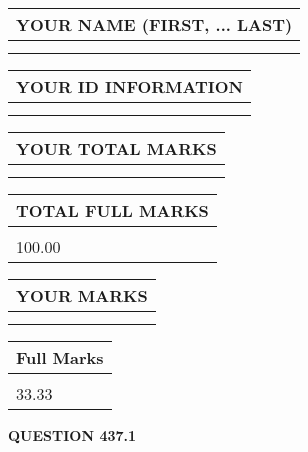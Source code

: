 \documentclass{ctexart}
\begin{document}
   
   
   
\newpage 
\setcounter{page}{ 
   437001 } 
   
   
   
   
\noindent\begin{tabular}{|l|}
\hline
YOUR NAME (FIRST, ... LAST)  \\
\hline
 \\ 
 \\ 
\hline
\end{tabular}
\hspace{0.05in} \begin{tabular}{|l|}
\hline
 YOUR   ID   INFORMATION  \\
\hline
 \\ 
 \\ 
\hline
\end{tabular}
   
   
\vspace{0.2in}\noindent\begin{tabular}{|l|}
\hline
YOUR TOTAL MARKS  \\
\hline
 \\ 
 \\ 
\hline
\end{tabular}
\hspace{0.05in} \begin{tabular}{|l|}
\hline
TOTAL FULL MARKS  \\
\hline
 \\ 
100.00 \\
\hline
\end{tabular}
   
   
 \vspace{0.2in}
 
 
 
 
   
   
  
\vspace{0.2in}
  
\noindent\begin{tabular}{|l|}
\hline
 YOUR MARKS  \\
\hline
 \\ 
 \\ 
\hline
\end{tabular}
\hspace{0.05in} \begin{tabular}{|l|}
\hline
 Full Marks  \\
\hline
 \\ 
33.33 \\
\hline
\end{tabular}
{\textbf{\Large{QUESTION
437.1 
}}}
  
\end{document}
